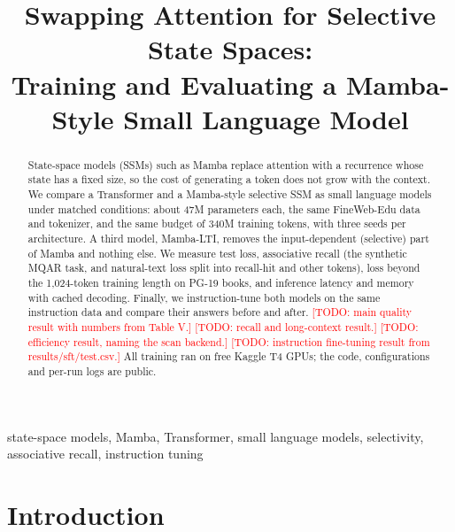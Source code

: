 \documentclass[conference]{IEEEtran}
\newcommand{\todo}[1]{\textcolor{red}{[TODO: #1]}}
\begin{document}
\title{Swapping Attention for Selective State Spaces:\\
Training and Evaluating a Mamba-Style Small Language Model}

\author{
}

\maketitle

\begin{abstract}
State-space models (SSMs) such as Mamba replace attention with a recurrence whose state has a fixed
size, so the cost of generating a token does not grow with the context. We compare a Transformer and a
Mamba-style selective SSM as small language models under matched conditions: about 47M parameters
each, the same FineWeb-Edu data and tokenizer, and the same budget of 340M training tokens, with three
seeds per architecture. A third model, Mamba-LTI, removes the input-dependent (selective) part of Mamba
and nothing else. We measure test loss, associative recall (the synthetic MQAR task, and natural-text
loss split into recall-hit and other tokens), loss beyond the 1,024-token training length on PG-19
books, and inference latency and memory with cached decoding. Finally, we instruction-tune both models
on the same instruction data and compare their answers before and after.
\todo{main quality result with numbers from Table V.}
\todo{recall and long-context result.}
\todo{efficiency result, naming the scan backend.}
\todo{instruction fine-tuning result from results/sft/test.csv.}
All training ran on free Kaggle T4 GPUs; the code, configurations and per-run logs are public.
\end{abstract}

\begin{IEEEkeywords}
state-space models, Mamba, Transformer, small language models, selectivity, associative recall,
instruction tuning
\end{IEEEkeywords}

\section{Introduction}
\end{document}
